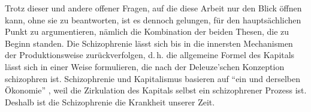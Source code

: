 \documentclass[12pt,
               paper=a4,
               twoside=false,
               onehalfspacing,
               bibliography=totoc,
               toc=graduated,
               ]{scrartcl}
\newcommand{\pc}[2]{\parencite[#1]{#2}}
\begin{document}
Trotz dieser und andere offener Fragen, auf die diese Arbeit nur den
Blick öffnen kann, ohne sie zu beantworten, ist es dennoch gelungen,
für den hauptsächlichen Punkt zu argumentieren, nämlich die
Kombination der beiden Thesen, die zu Beginn standen. Die
Schizophrenie lässt sich bis in die innersten Mechanismen der
Produktionsweise zurückverfolgen, d.\,h. die allgemeine Formel des
Kapitals lässt sich in einer Weise formulieren, die nach der
Deleuze'schen Konzeption schizophren ist. Schizophrenie und
Kapitalismus basieren auf "`ein und derselben Ökonomie"' \pc{315}{ao},
weil die Zirkulation des Kapitals selbst ein schizophrener Prozess
ist. Deshalb ist die Schizophrenie die Krankheit unserer Zeit.

%
%
%
%
%
%
%

%


\newpage
\printshorthands
\printbibliography
\end{document}
